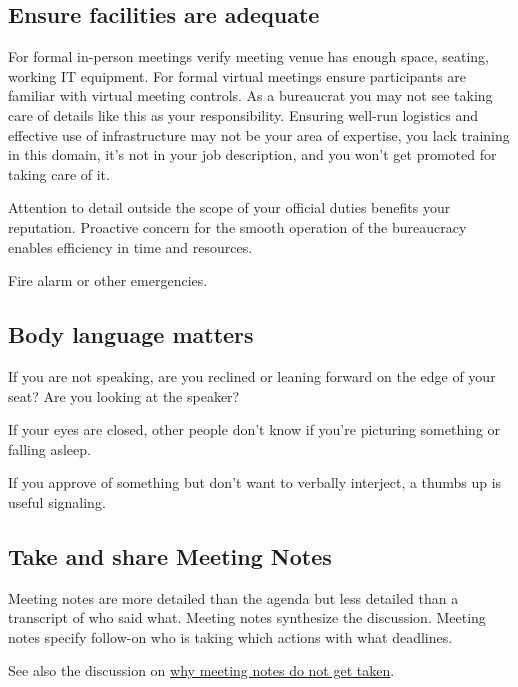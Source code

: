 \subsection*{Ensure facilities are adequate}
For formal in-person meetings verify meeting venue has enough space, seating, working IT equipment. For formal virtual meetings ensure participants are familiar with virtual meeting controls. 
As a bureaucrat you may not see taking care of details like this as your responsibility. Ensuring well-run logistics and effective use of infrastructure may not be your area of expertise, you lack training in this domain, it's not in your job description, and you won't get promoted for taking care of it. 

Attention to detail outside the scope of your official duties benefits your reputation. Proactive concern for the smooth operation of the bureaucracy enables efficiency in time and resources.


Fire alarm or other emergencies. 

\subsection*{Body language matters}

If you are not speaking, are you reclined or leaning forward on the edge of your seat? Are you looking at the speaker?

If your eyes are closed, other people don't know if you're picturing something or falling asleep. 

If you approve of something but don't want to verbally interject, a thumbs up is useful signaling. 

\subsection*{Take and share Meeting Notes}

Meeting notes are more detailed than the agenda but less detailed than a transcript of who said what. Meeting notes synthesize the discussion. Meeting notes specify follow-on who is taking which actions with what deadlines. 

See also the discussion on \hyperref[sec:written-comm-does-not-happen]{why meeting notes do not get taken}.

